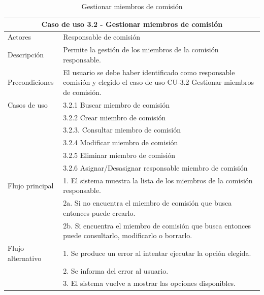 \begin{table}[H]
    \caption{Gestionar miembros de comisión}
    \label{tab:CU-3.2}
    \begin{center}
        \begin{tabular}{|l|p{12cm}|}
            \hline
            \multicolumn{2}{|c|}{Caso de uso 3.2 - Gestionar miembros de comisión} \\
            \hline \hline
            Actores                 &   Responsable de comisión          \\  
            \hline
            Descripción             &   Permite la gestión de los miembros de la comisión responsable. \\  \hline
            Precondiciones          &   El usuario se debe haber identificado como responsable comisión y elegido el caso de uso CU-3.2 Gestionar miembros de comisión. \\  \hline
            Casos de uso            & 
            3.2.1 Buscar miembro de comisión \\ 
            &
            3.2.2 Crear miembro de comisión \\ 
            & 
            3.2.3. Consultar miembro de comisión\\ 
            & 
            3.2.4 Modificar miembro de comisión \\ 
            &  
            3.2.5 Eliminar miembro de comisión \\ 
            &
            3.2.6 Asignar/Desasignar responsable miembro de comisión \\
            \hline
   
            Flujo principal         &   1. El sistema muestra la lista de los miembros de la comisión responsable.   \\ 
            & 2a. Si no encuentra el miembro de comisión que busca entonces puede crearlo. \\ 
            & 2b. Si encuentra el miembro de comisión que busca entonces puede consultarlo, modificarlo o borrarlo. \\ \hline
            Flujo alternativo    &   1. Se produce un error al intentar ejecutar la opción elegida.  \\ 
            & 2. Se informa del error al usuario. \\
            & 3. El sistema vuelve a mostrar las opciones disponibles. \\
            \hline
        \end{tabular}
    \end{center}
\end{table}

